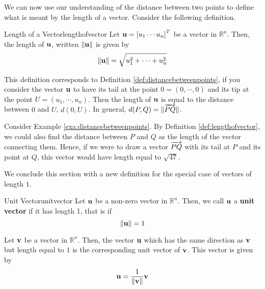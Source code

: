 We can now use our understanding of the distance between two points to define what is meant by the length of a 
vector. Consider the following definition.  

\begin{definition}{Length of a Vector}{lengthofvector}
Let ${\bf u} = \left[ u_{1} \cdots u_{n} \right]^T$ be a vector in
$\mathbb{R}^n$. Then, the length of ${\bf u}$, written $\| {\bf u} \|$  is given by
\begin{equation*}
\|
{\bf u}
\|
= \sqrt{ u_{1}^2 + \cdots + u_{n}^2}
\end{equation*}
\end{definition}

This definition corresponds to Definition
\ref{def:distancebetweenpoints}, if you consider the vector ${\bf u}$
to have its tail at the point $0 = \left( 0, \cdots ,0 \right)$ and its
tip at the point $U = \left(u_1, \cdots, u_n \right)$.  Then the length of
${\bf u}$ is equal to the distance between $0$ and $U$, $d(0,U)$. In general, $d(P,Q) = \| \overrightarrow{PQ} \|$. 

Consider Example \ref{exa:distancebetweenpoints}. By Definition \ref{def:lengthofvector}, we could also find the distance between $P$ and $Q$ 
as the length of the vector connecting them. Hence, if we were to draw a vector $\overrightarrow{PQ}$ 
with its tail at $P$ and its point at $Q$, this vector would have length equal to 
$\sqrt{47}$.

We conclude this section with a new definition for the special case of
vectors of length $1$.

\begin{definition}{Unit Vector}{unitvector}
Let ${\bf u}$ be a non-zero vector in $\mathbb{R}^{n}$. Then, we call ${\bf u}$ a 
\textbf{unit vector}  if it has length 1, that is if
\begin{equation*}
\| {\bf u} \|
=
1
\end{equation*}
\end{definition}

Let ${\bf v}$ be a vector in $\mathbb{R}^{n}$. Then, the vector ${\bf u}$
which has the same direction as ${\bf v}$ but length equal to $1$ is the corresponding unit vector of ${\bf v}$. 
This vector is given by
\begin{equation*}
{\bf u}
=
\frac{1}{\| {\bf v} \|}
{\bf v}
\end{equation*}

